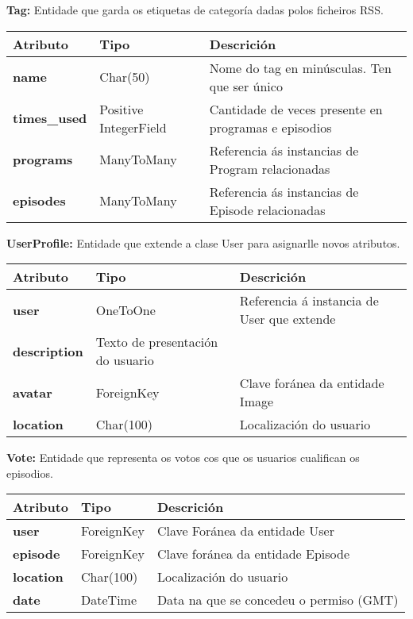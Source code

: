 \textbf{Tag:}  Entidade que garda os etiquetas de categoría dadas polos ficheiros RSS.

\begin{tabular}{|p{3cm}|p{3cm}|p{8cm}|}
	\hline
	Atributo & Tipo & Descrición\\
	\hline
	\textbf{name} & Char(50) & Nome do tag en minúsculas. Ten que ser único\\
	\hline
	\textbf{times\_used} & Positive IntegerField & Cantidade de veces presente en programas e episodios\\	
	\hline
	\textbf{programs} & ManyToMany & Referencia ás instancias de Program relacionadas\\
	\hline
	\textbf{episodes} & ManyToMany & Referencia ás instancias de Episode relacionadas\\
	\hline
\end{tabular}


\textbf{UserProfile:}  Entidade que extende a clase User para asignarlle novos atributos.

\begin{tabular}{|p{3cm}|p{3cm}|p{8cm}|}
	\hline
	Atributo & Tipo & Descrición\\
	\hline
	\textbf{user} & OneToOne & Referencia á instancia de User que extende\\
	\hline
	\textbf{description} & Texto de presentación do usuario\\	
	\hline
	\textbf{avatar} & ForeignKey & Clave foránea da entidade Image\\
	\hline
	\textbf{location} & Char(100) & Localización do usuario\\
	\hline
\end{tabular}


\textbf{Vote:}  Entidade que representa os votos cos que os usuarios cualifican os episodios.

\begin{tabular}{|p{3cm}|p{3cm}|p{8cm}|}
	\hline
	Atributo & Tipo & Descrición\\
	\hline
	\textbf{user} & ForeignKey & Clave Foránea da entidade User\\
	\hline
	\textbf{episode} & ForeignKey & Clave foránea da entidade Episode\\
	\hline
	\textbf{location} & Char(100) & Localización do usuario\\
	\hline
	\textbf{date} & DateTime & Data na que se concedeu o permiso (GMT)\\
	\hline
\end{tabular}

